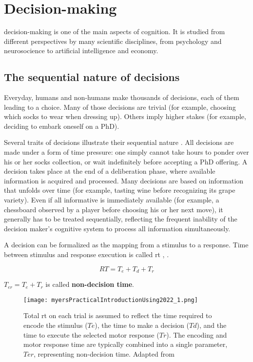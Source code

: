 \chapter{Decision-making}


\Gls{decision-making} is one of the main aspects of cognition. It is studied from different perspectives by many scientific disciplines, from psychology and neurosocience to artificial intelligence and economy.

\section{The sequential nature of decisions}

Everyday, humans and non-humans make thousands of \glspl{decision}, each of them leading to a \gls{choice}. Many of those decisions are trivial (for example, choosing which socks to wear when dressing up). Others imply higher stakes (for example, deciding to embark oneself on a PhD).

Several traits of decisions illustrate their sequential nature \cite{forstmannSequentialSamplingModels2016}. All decisions are made under a form of time pressure: one simply cannot take hours to ponder over his or her socks collection, or wait indefinitely before accepting a PhD offering. A decision takes place at the end of a deliberation phase, where available information is acquired and processed. Many decisions are based on information that unfolds over time (for example, tasting wine before recognizing its grape variety). Even if all informative is immediately available (for example, a chessboard observed by a player before choosing his or her next move), it generally has to be treated sequentially, reflecting the frequent inability of the decision maker's cognitive system to process all information simultaneously.

A decision can be formalized as the mapping from a stimulus to a response. Time between stimulus and response execution is called \acrfull{rt} \cite{forstmannSequentialSamplingModels2016}, \cite{myersPracticalIntroductionUsing2022}.

$$RT = T_e+T_d+T_r$$

$T_{er}= T_e+T_r$ is called \textbf{non-decision time}.

\begin{figure}[ht]
    \centering
    \texttt{[image: myersPracticalIntroductionUsing2022\_1.png]}
    \caption[Schematc of a decision]{Total \acrshort{rt} on each trial is assumed to reflect the time required to encode the stimulus ($Te$), the time to make a decision ($Td$), and the time to execute the selected motor response ($Tr$). The encoding and motor response time are typically combined into a single parameter, $Ter$, representing non-decision time. Adapted from \cite{myersPracticalIntroductionUsing2022}}
\end{figure}

